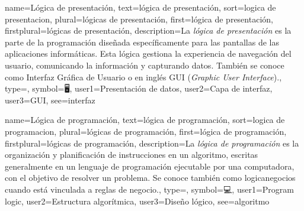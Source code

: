 	{
		name={L{\'o}gica de presentaci{\'o}n},
		text={l{\'o}gica de presentaci{\'o}n},
		sort={logica de presentacion},
		plural={l{\'o}gicas de presentaci{\'o}n},
		first={l{\'o}gica de presentaci{\'o}n},
		firstplural={l{\'o}gicas de presentaci{\'o}n},
		description={La \emph{l{\'o}gica de presentaci{\'o}n} es la parte de la programaci{\'o}n dise{\~n}ada espec{\'i}ficamente para las pantallas de las aplicaciones inform{\'a}ticas. Esta l{\'o}gica gestiona la experiencia de navegaci{\'o}n del usuario, comunicando la informaci{\'o}n y capturando datos. Tambi{\'e}n se conoce como Interfaz Gr{\'a}fica de Usuario o en ingl{\'e}s GUI (\textit{Graphic User Interface}).},
		type=\glsdefaulttype,
		symbol={🖥},
		user1={Presentaci{\'o}n de datos},
		user2={Capa de interfaz},
		user3={GUI},
		see={interfaz}
	}
	
	{
		name={L{\'o}gica de programaci{\'o}n},
		text={l{\'o}gica de programaci{\'o}n},
		sort={logica de programacion},
		plural={l{\'o}gicas de programaci{\'o}n},
		first={l{\'o}gica de programaci{\'o}n},
		firstplural={l{\'o}gicas de programaci{\'o}n},
		description={La \emph{l{\'o}gica de programaci{\'o}n} es la organizaci{\'o}n y planificaci{\'o}n de instrucciones en un \gls{algoritmo}, escritas generalmente en un lenguaje de programaci{\'o}n ejecutable por una computadora, con el objetivo de resolver un problema. Se conoce tambi{\'e}n como \gls{logicanegocios} cuando est{\'a} vinculada a reglas de negocio.},
		type=\glsdefaulttype,
		symbol={💻},
		user1={Program logic},
		user2={Estructura algor{\'i}tmica},
		user3={Dise{\~n}o l{\'o}gico},
		see={algoritmo}
	}
	
	
